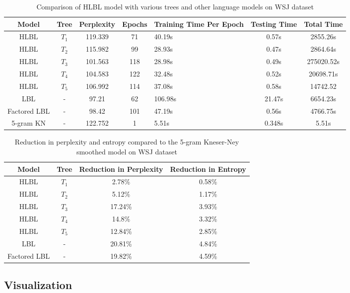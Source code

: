 \begin{table*} \centering
{}
\begin{tabular}{@{}ccccC{2cm}cc@{}}\toprule
Model & Tree & Perplexity & Epochs & Training Time Per Epoch & Testing Time & Total Time\\ 
\midrule
 HLBL & $T_1$ &119.339 & 71& 40.19s & 0.57s& 2855.26s\\
 HLBL & $T_2$ &115.982 & 99& 28.93s & 0.47s & 2864.64s\\
 HLBL & $T_3$ &101.563 & 118& 28.98s & 0.49s & 275020.52s \\
 HLBL & $T_4$ &104.583 & 122& 32.48s & 0.52s & 20698.71s\\
 HLBL & $T_5$ &106.992 & 114& 37.08s & 0.58s& 14742.52\\
 LBL& - &97.21 &62 &106.98s & 21.47s& 6654.23s\\
 Factored LBL & - &98.42&101 & 47.19s & 0.56s & 4766.75s \\
 5-gram KN & - &122.752& 1 & 5.51s & 0.348s & 5.51s\\
\bottomrule
\end{tabular}
\caption{Comparison of HLBL model with various trees and other language models on WSJ dataset}
\label{tab:languageModelComparison}
\end{table*}

\begin{table*} \centering
{}
\begin{tabular}{@{}cccc@{}}\toprule
Model & Tree & Reduction in Perplexity & Reduction in Entropy\\ 
\midrule
 HLBL & $T_1$ &2.78\% & 0.58\%\\
 HLBL & $T_2$ &5.12\% & 1.17\%\\
 HLBL & $T_3$ &17.24\% & 3.93\% \\
 HLBL & $T_4$ &14.8\% & 3.32\%\\
 HLBL & $T_5$ &12.84\% & 2.85\%\\
 LBL& - & 20.81\% &4.84\% \\
 Factored LBL & - &19.82\%&4.59\%\\
\bottomrule
\end{tabular}
\caption{Reduction in perplexity and entropy compared to the 5-gram Kneser-Ney smoothed model on WSJ dataset}
\label{tab:reductionPerplexity}
\end{table*}

\subsection{Visualization} \label{sec:tsne}
